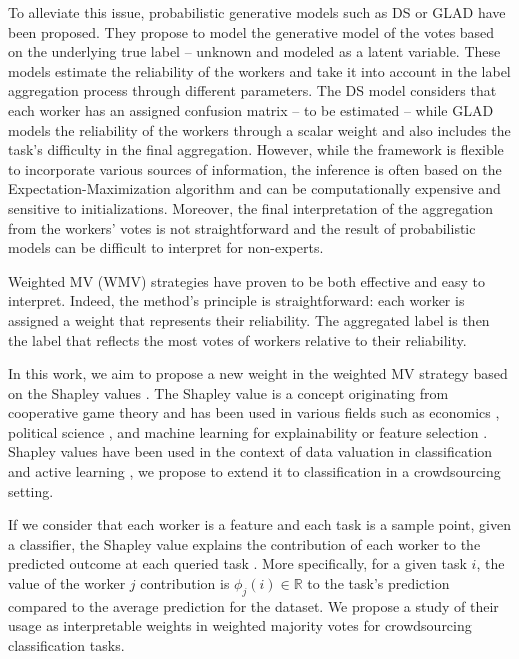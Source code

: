 \documentclass{cap2024}
\begin{document}
To alleviate this issue, probabilistic generative models such as DS \citep{dawid_maximum_1979} or GLAD \citep{whitehill_whose_2009} have been proposed.
They propose to model the generative model of the votes based on the underlying true label -- unknown and modeled as a latent variable.
These models estimate the reliability of the workers and take it into account in the label aggregation process through different parameters. The DS model considers that each worker has an assigned confusion matrix -- to be estimated -- while GLAD models the reliability of the workers through a scalar weight and also includes the task's difficulty in the final aggregation.
However, while the framework is flexible to incorporate various sources of information, the inference is often based on the Expectation-Maximization algorithm and can be computationally expensive and sensitive to initializations.
Moreover, the final interpretation of the aggregation from the workers' votes is not straightforward and the result of probabilistic models can be difficult to interpret for non-experts.

Weighted MV (WMV) strategies \citep{appen_wawa_2021,karger2011iterative,ma2020adversarial} have proven to be both effective and easy to interpret. Indeed, the method's principle is straightforward: each worker is assigned a weight that represents their reliability. The aggregated label is then the label that reflects the most votes of workers relative to their reliability.

In this work, we aim to propose a new weight in the weighted MV strategy based on the Shapley values \citep{shapley1953value}.
The Shapley value is a concept originating from cooperative game theory and has been used in various fields such as economics \citep{aumann1994economic}, political science \citep{engelbrecht2009use}, and machine learning for explainability \citep{lundberg2017unified} or feature selection \citep{cohen2007feature}.
Shapley values have been used in the context of data valuation in classification \citep{schoch2022cs} and active learning \citep{ghorbani2022data}, we propose to extend it to classification in a crowdsourcing setting.

If we consider that each worker is a feature and each task is a sample point, given a classifier, the Shapley value explains the contribution of each worker to the predicted outcome at each queried task \citep{molnar2020interpretable}.
More specifically, for a given task $i$, the value of the worker $j$ contribution is $\phi_j(i)\in\mathbb{R}$ to the task's prediction compared to the average prediction for the dataset.
We propose a study of their usage as interpretable weights in weighted majority votes for crowdsourcing classification tasks.
\end{document}
